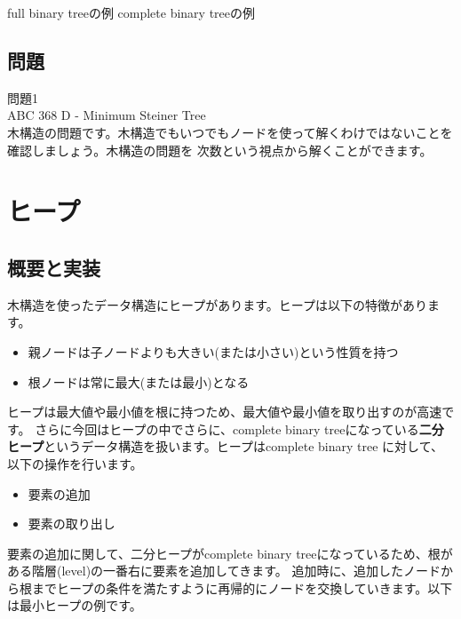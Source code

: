 \hspace{1.5cm} full binary treeの例 \hspace{4.5cm} complete binary treeの例

\subsection{問題}
問題1 \\
ABC 368 D - Minimum Steiner Tree \\
木構造の問題です。木構造でもいつでもノードを使って解くわけではないことを確認しましょう。木構造の問題を
次数という視点から解くことができます。\\

\newpage

\section{ヒープ}
\subsection{概要と実装}
木構造を使ったデータ構造にヒープがあります。ヒープは以下の特徴があります。

\begin{itemize}
	\item 親ノードは子ノードよりも大きい(または小さい)という性質を持つ
	\item 根ノードは常に最大(または最小)となる
\end{itemize}

ヒープは最大値や最小値を根に持つため、最大値や最小値を取り出すのが高速です。
さらに今回はヒープの中でさらに、complete binary treeになっている\textbf{二分ヒープ}というデータ構造を扱います。ヒープはcomplete binary tree
に対して、以下の操作を行います。

\begin{itemize}
	\item 要素の追加
	\item 要素の取り出し
\end{itemize}

要素の追加に関して、二分ヒープがcomplete binary treeになっているため、根がある階層(level)の一番右に要素を追加してきます。
追加時に、追加したノードから根までヒープの条件を満たすように再帰的にノードを交換していきます。以下は最小ヒープの例です。

